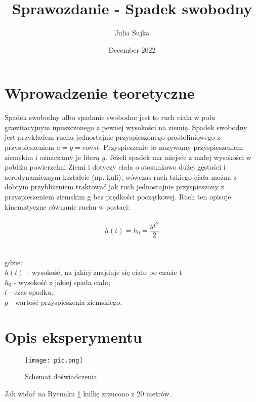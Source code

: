 \documentclass{article}
\title{Sprawozdanie - Spadek swobodny}
\author{Julia Sujka}
\date{December 2022}
\begin{document}
\maketitle

\section{Wprowadzenie teoretyczne}
Spadek swobodny albo spadanie swobodne jest to ruch ciała w polu grawitacyjnym upuszczonego z
pewnej wysokości na ziemię. Spadek swobodny jest przykładem ruchu jednostajnie przyspieszonego
prostoliniowego z przyspieszeniem $a=g=const$. Przyspieszenie to nazywamy przyspieszeniem
ziemskim i oznaczamy je literą $g$. Jeżeli spadek ma miejsce z małej wysokości w pobliżu powierzchni
Ziemi i dotyczy ciała o stosunkowo dużej gęstości i aerodynamicznym kształcie (np. kuli), wówczas
ruch takiego ciała można z dobrym przybliżeniem traktować jak ruch jednostajnie przyspieszony z
przyspieszeniem ziemskim g bez prędkości początkowej. Ruch ten opisuje kinematyczne równanie
ruchu w postaci:
\\
\\
\begin{equation}
h(t)=h_0=\frac{gt^2}{2}
\end{equation}\\
\\
gdzie: \\
$h(t)$ – wysokość, na jakiej znajduje się ciało po czasie t \\
$h_0$ - wysokość z jakiej spada ciało; \\
$t$ - czas spadku;\\
$g$ - wartość przyspieszenia ziemskiego.\\

\newpage

\section{Opis eksperymentu}
\begin{center}
\begin{figure}[hp]
\centering
\texttt{[image: pic.png]}
\caption{Schemat doświadczenia}
\label{fig:schemat}
\end{figure}
\end{center}
Jak widać na Rysunku \ref{fig:schemat} kulkę zrzucono z 20 metrów.
\end{document}
